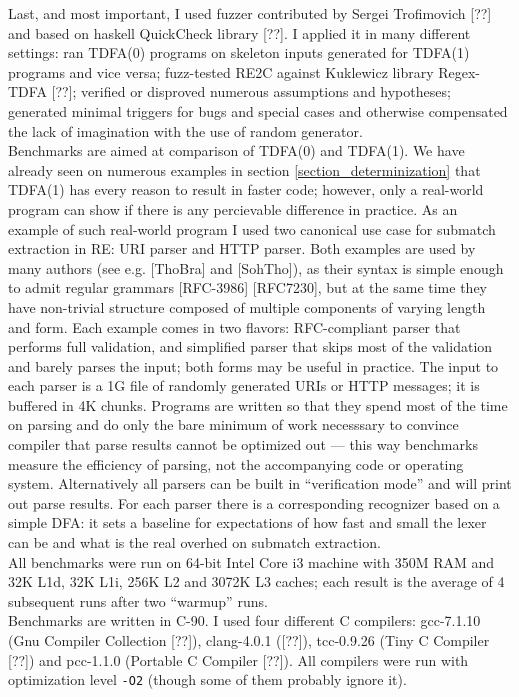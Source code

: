 \documentclass{article}
\theoremstyle{definition}
\begin{document}
\begin{multicols}{2}
Last, and most important, I used fuzzer contributed by Sergei Trofimovich [??] and based on haskell QuickCheck library [??].
I applied it in many different settings:
ran TDFA(0) programs on skeleton inputs generated for TDFA(1) programs and vice versa;
fuzz-tested RE2C against Kuklewicz library Regex-TDFA [??];
verified or disproved numerous assumptions and hypotheses;
generated minimal triggers for bugs and special cases
and otherwise compensated the lack of imagination with the use of random generator.
\\

Benchmarks are aimed at comparison of TDFA(0) and TDFA(1).
We have already seen on numerous examples in section \ref{section_determinization}
that TDFA(1) has every reason to result in faster code;
however, only a real-world program can show if there is any percievable difference in practice.
As an example of such real-world program I used two canonical use case for submatch extraction in RE: URI parser and HTTP parser.
Both examples are used by many authors (see e.g. [ThoBra] and [SohTho]),
as their syntax is simple enough to admit regular grammars [RFC-3986] [RFC7230],
but at the same time they have non-trivial structure composed of multiple components of varying length and form.
Each example comes in two flavors: RFC-compliant parser that performs full validation,
and simplified parser that skips most of the validation and barely parses the input; both forms may be useful in practice.
The input to each parser is a 1G file of randomly generated URIs or HTTP messages; it is buffered in 4K chunks.
Programs are written so that they spend most of the time on parsing
and do only the bare minimum of work necesssary to convince compiler that parse results cannot be optimized out ---
this way benchmarks measure the efficiency of parsing, not the accompanying code or operating system.
Alternatively all parsers can be built in ``verification mode'' and will print out parse results.
For each parser there is a corresponding recognizer based on a simple DFA:
it sets a baseline for expectations of how fast and small the lexer can be and what is the real overhed on submatch extraction.
\\

All benchmarks were run on 64-bit Intel Core i3 machine with 350M RAM and 32K L1d, 32K L1i, 256K L2 and 3072K L3 caches;
each result is the average of 4 subsequent runs after two ``warmup'' runs.
\\

Benchmarks are written in C-90.
I used four different C compilers:
gcc-7.1.10 (Gnu Compiler Collection [??]),
clang-4.0.1 ([??]),
tcc-0.9.26 (Tiny C Compiler [??])
and pcc-1.1.0 (Portable C Compiler [??]).
All compilers were run with optimization level \texttt{-O2} (though some of them probably ignore it).
\\


\end{multicols}
\end{document}
